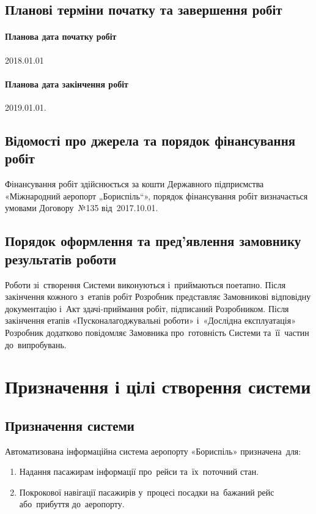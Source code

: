 \documentclass[
	a4paper,
	oneside,
	BCOR = 10mm,
	DIV = 12,
	12pt,
	headings = normal,
]{scrartcl}
\begin{document}
		\subsection{Планові терміни початку та завершення робіт}
			\paragraph{Планова дата початку робіт}
				2018.01.01
			\paragraph{Планова дата закінчення робіт}
				2019.01.01.

		\subsection{Відомості про джерела та порядок фінансування робіт}
			Фінансування робіт здійснюється за кошти Державного підприємства «Міжнародний аеропорт „Бориспіль“», порядок фінансування робіт визначається умовами Договору~№135 від~2017.10.01.

		\subsection{Порядок оформлення та пред'явлення замовнику результатів роботи}
			Роботи зі~створення Системи виконуються і~приймаються поетапно. Після закінчення кожного з~етапів робіт Розробник представляє Замовникові відповідну документацію і~Акт здачі-приймання робіт, підписаний Розробником. Після закінчення етапів «Пусконалагоджувальні роботи» і~«Дослідна експлуатація» Розробник додатково повідомляє Замовника про~готовність Системи та~її~частин до~випробувань.

	\section{Призначення і цілі створення системи}
		\subsection{Призначення системи}
			Автоматизована інформаційна система аеропорту «Бориспіль» призначена~для:
			\begin{enumerate}[noitemsep]
				\item Надання пасажирам інформації про~рейси та~їх~поточний стан.
				\item Покрокової навігації пасажирів у~процесі посадки на~бажаний рейс або~прибуття до~аеропорту. 
			\end{enumerate}
\end{document}
